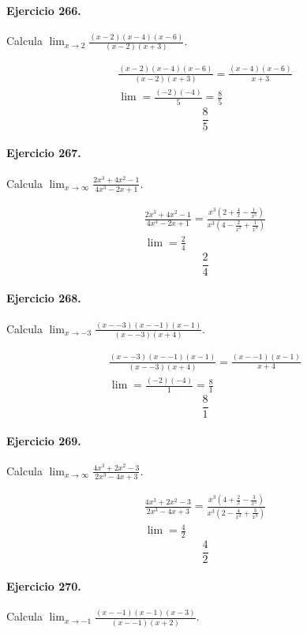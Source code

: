 \documentclass[11pt,a4paper]{article}
\begin{document}
\paragraph{Ejercicio 266.} Calcula $\displaystyle\lim_{x\to 2}\frac{(x-2)(x-4)(x-6)}{(x-2)(x+3)}$. 

\[
\begin{aligned}
\frac{(x-2)(x-4)(x-6)}{(x-2)(x+3)}=\frac{(x-4)(x-6)}{x+3}\\
\lim=\frac{(-2)(-4)}{5}=\frac{8}{5}
\end{aligned}
\]
\[\boxed{\frac{8}{5}}\]


\paragraph{Ejercicio 267.} Calcula $\displaystyle\lim_{x\to\infty}\frac{2x^3+4x^2-1}{4x^3-2x+1}$. 

\[
\begin{aligned}
\frac{2x^3+4x^2-1}{4x^3-2x+1}=\frac{x^3(2+\frac{4}{x}-\frac{1}{x^3})}{x^3(4-\frac{2}{x^2}+\frac{1}{x^3})}\\
\lim=\frac{2}{4}
\end{aligned}
\]
\[\boxed{\frac{2}{4}}\]


\paragraph{Ejercicio 268.} Calcula $\displaystyle\lim_{x\to -3}\frac{(x--3)(x--1)(x-1)}{(x--3)(x+4)}$. 

\[
\begin{aligned}
\frac{(x--3)(x--1)(x-1)}{(x--3)(x+4)}=\frac{(x--1)(x-1)}{x+4}\\
\lim=\frac{(-2)(-4)}{1}=\frac{8}{1}
\end{aligned}
\]
\[\boxed{\frac{8}{1}}\]


\paragraph{Ejercicio 269.} Calcula $\displaystyle\lim_{x\to\infty}\frac{4x^3+2x^2-3}{2x^3-4x+3}$. 

\[
\begin{aligned}
\frac{4x^3+2x^2-3}{2x^3-4x+3}=\frac{x^3(4+\frac{2}{x}-\frac{3}{x^3})}{x^3(2-\frac{4}{x^2}+\frac{3}{x^3})}\\
\lim=\frac{4}{2}
\end{aligned}
\]
\[\boxed{\frac{4}{2}}\]


\paragraph{Ejercicio 270.} Calcula $\displaystyle\lim_{x\to -1}\frac{(x--1)(x-1)(x-3)}{(x--1)(x+2)}$. 
\end{document}
